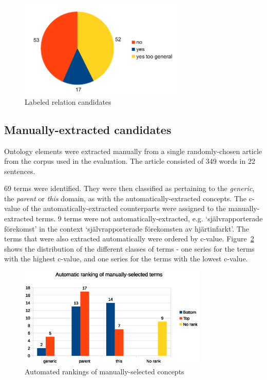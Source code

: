 \documentclass[a4paper]{report}
\begin{document}
\begin{figure}
  \centering
  \includegraphics[width=0.7\textwidth]{graphics/labeled-relations}
  \caption{Labeled relation candidates}
  \label{fig:rel-cands}
\end{figure}

\subsection{Manually-extracted candidates}
\label{sec:results:eval:cands_manual}

Ontology elements were extracted manually from a single randomly-chosen article from the corpus used in the evaluation.
The article consisted of 349 words in 22 sentences.

69 terms were identified.
They were then classified as pertaining to the \emph{generic}, the \emph{parent} or \emph{this} domain, as with the automatically-extracted concepts.
The c-value of the automatically-extracted counterparts were assigned to the manually-extracted terms.
9 terms were not automatically-extracted, e.g. `självrapporterade förekomst' in the context `självrapporterade förekomsten av hjärtinfarkt'.
The terms that were also extracted automatically were ordered by c-value.
Figure~\ref{fig:concepts-manual} shows the distribution of the different classes of terms - one series for the terms with the highest c-value, and one series for the terms with the lowest c-value.

\begin{figure}
  \centering
  \includegraphics[width=0.8\textwidth]{graphics/concepts-manual.eps}
  \caption{Automated rankings of manually-selected concepts}
  \label{fig:concepts-manual}
\end{figure}
\end{document}
